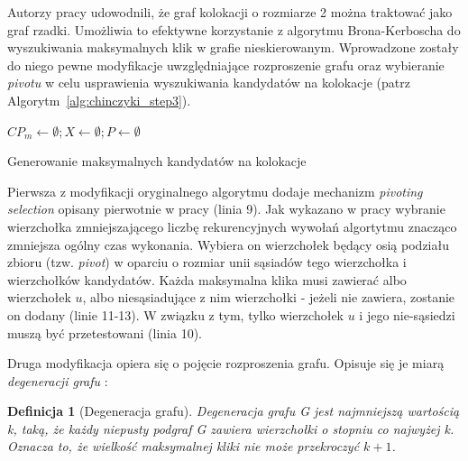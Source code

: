 \documentclass[12pt]{article}
\makeatletter
\newtheorem{defin}{Definicja}
\newcounter{algorytm}
\newenvironment{algorytm}[1][htb]
  {
  \renewcommand*{\algorithmcfname}{Algorytm}%
  \let\c@algocf\c@algorytm
   \begin{algorithm}[#1]
  }
  {\end{algorithm}}
\makeatother
\begin{document}
Autorzy pracy \cite{chinczyki} udowodnili, że graf kolokacji o rozmiarze 2 można traktować jako graf rzadki. Umożliwia to efektywne korzystanie z algorytmu Brona-Kerboscha \cite{kerbosz} do wyszukiwania maksymalnych klik w grafie nieskierowanym. Wprowadzone zostały do niego pewne modyfikacje uwzględniające rozproszenie grafu oraz wybieranie \textit{pivotu} w celu usprawienia wyszukiwania kandydatów na kolokacje (patrz Algorytm~\ref{alg:chinczyki_step3}).

\begin{algorytm}

$CP_{m} \leftarrow \emptyset; X \leftarrow \emptyset; P \leftarrow \emptyset$\;

\caption{Generowanie maksymalnych kandydatów na kolokacje}
\label{alg:chinczyki_step3}
\end{algorytm}

Pierwsza z modyfikacji oryginalnego algorytmu dodaje mechanizm \textit{pivoting selection} opisany pierwotnie w pracy \cite{pivot} (linia 9). Jak wykazano w pracy \cite{pivot2} wybranie wierzchołka zmniejszającego liczbę rekurencyjnych wywołań algortytmu znacząco zmniejsza ogólny czas wykonania. Wybiera on wierzchołek będący osią podziału zbioru (tzw. \textit{pivot}) w oparciu o rozmiar unii sąsiadów tego wierzchołka i wierzchołków kandydatów. Każda maksymalna klika musi zawierać albo wierzchołek $ u $, albo niesąsiadujące z nim wierzchołki - jeżeli nie zawiera, zostanie on dodany (linie 11-13). W związku z tym, tylko wierzchołek $ u $ i jego nie-sąsiedzi muszą być przetestowani (linia 10).

Druga modyfikacja opiera się o pojęcie rozproszenia grafu. Opisuje się je miarą \textit{degeneracji grafu} \cite{matusiak}:
\begin{defin}[Degeneracja grafu]
Degeneracja grafu G jest najmniejszą wartością k, taką, że każdy niepusty podgraf G zawiera wierzchołki o stopniu co najwyżej k. Oznacza to, że wielkość maksymalnej kliki nie może przekroczyć $k + 1$.
\label{def:degeneracy}
\end{defin}
\end{document}
